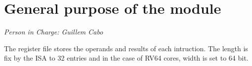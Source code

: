 \newpage
\section{General purpose of the module}
\textit{Person in Charge: Guillem Cabo}

The register file stores the operands and results of each intruction. The length is fix by the ISA to 32 entries and in the case of RV64 cores, width is set to 64 bit.

